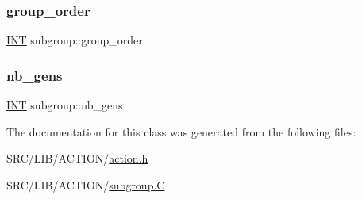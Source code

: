 \mbox{\label{classsubgroup_acb55a787275d4983e8a3f9ae5a1007fb}} 
\subsubsection{\texorpdfstring{group\+\_\+order}{group\_order}}
{\footnotesize\ttfamily \mbox{\hyperlink{galois_8h_a09fddde158a3a20bd2dcadb609de11dc}{I\+NT}} subgroup\+::group\+\_\+order}

\mbox{\label{classsubgroup_aff3a1e4d5c8dd46d159296a5c49e86e4}} 
\subsubsection{\texorpdfstring{nb\+\_\+gens}{nb\_gens}}
{\footnotesize\ttfamily \mbox{\hyperlink{galois_8h_a09fddde158a3a20bd2dcadb609de11dc}{I\+NT}} subgroup\+::nb\+\_\+gens}



The documentation for this class was generated from the following files\+:\begin{DoxyCompactItemize}
\item 
S\+R\+C/\+L\+I\+B/\+A\+C\+T\+I\+O\+N/\mbox{\hyperlink{action_8h}{action.\+h}}\item 
S\+R\+C/\+L\+I\+B/\+A\+C\+T\+I\+O\+N/\mbox{\hyperlink{subgroup_8_c}{subgroup.\+C}}\end{DoxyCompactItemize}
